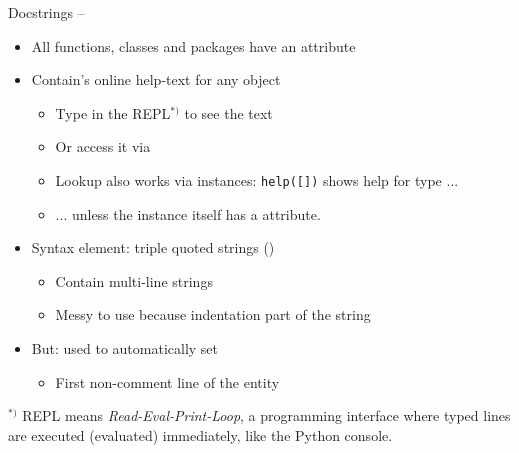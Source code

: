 
\begin{frame}[fragile]{Docstrings -- }
%
\begin{itemize}
\item All functions, classes and packages have an attribute 
\item Contain's online help-text for any object
	\begin{itemize}
	\item Type  in the REPL$^{*)}$ to see the text
	\item Or access it via  
	\item Lookup also works via instances: \texttt{help([])} shows help for type  ...
	\item ... unless the instance itself has a  attribute.
	\end{itemize}
\item Syntax element: triple quoted strings ()
	\begin{itemize}
	\item Contain multi-line strings
	\item Messy to use because indentation part of the string
	\end{itemize}
\item But: used to automatically set  
	\begin{itemize}
	\item First non-comment line of the entity
	\end{itemize}
\end{itemize}
%
\begin{hintbox}[REPL]
\footnotesize
$^{*)}$ REPL means \emph{Read-Eval-Print-Loop}, \ie a programming interface where typed lines are executed (evaluated) immediately, like the Python console.
\end{hintbox}
%
\end{frame}



